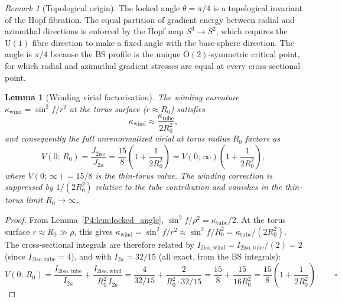 \documentclass[11pt,a4paper]{article}
\newtheorem{lemma}[theorem]{Lemma}
\theoremstyle{definition}
\theoremstyle{remark}
\newtheorem{remark}[theorem]{Remark}
\begin{document}
\begin{remark}[Topological origin]
\label{P4:rem:theta_topological_origin}
The locked angle $\theta = \pi/4$ is a topological invariant of the Hopf
fibration.  The equal partition of gradient energy between radial and
azimuthal directions is enforced by the Hopf map $S^3\to S^2$, which
requires the $\mathrm{U}(1)$ fibre direction to make a fixed angle with
the base-sphere direction.  The angle is $\pi/4$ because the BS profile
is the unique $\mathrm{O}(2)$-symmetric critical point, for which radial
and azimuthal gradient stresses are equal at every cross-sectional point.
\end{remark}

\begin{lemma}[Winding virial factorisation]
\label{P4:lem:virial_factor}
The winding curvature $\kappa_\mathrm{wind} = \sin^2\!f/r^2$ at the torus
surface ($r \approx R_0$) satisfies
\begin{equation}
  \kappa_\mathrm{wind} \approx \frac{\kappa_\mathrm{tube}}{2R_0^2},
  \label{P4:eq:kappa_wind_exact}
\end{equation}
and consequently the full unrenormalized virial at torus radius $R_0$ factors as
\begin{equation}
  V(0;\,R_0)
  = \frac{J_{2\mathrm{iso}}}{J_{2a}}
  = \frac{15}{8}\!\left(1 + \frac{1}{2R_0^2}\right)
  = V(0;\,\infty)\!\left(1 + \frac{1}{2R_0^2}\right),
  \label{P4:eq:virial_factor}
\end{equation}
where $V(0;\,\infty) = 15/8$ is the thin-torus value.
The winding correction is suppressed by $1/(2R_0^2)$ relative to the tube
contribution and vanishes in the thin-torus limit $R_0\to\infty$.
\end{lemma}

\begin{proof}
From Lemma~\ref{P4:lem:locked_angle}, $\sin^2\!f/\rho^2 = \kappa_\mathrm{tube}/2$.
At the torus surface $r \approx R_0 \gg \rho$, this gives
$\kappa_\mathrm{wind} = \sin^2\!f/r^2 \approx \sin^2\!f/R_0^2 = \kappa_\mathrm{tube}/(2R_0^2)$.
The cross-sectional integrals are therefore related by
$I_{2\mathrm{iso,wind}} = I_{2\mathrm{iso,tube}}/(2) = 2$ (since $I_{2\mathrm{iso,tube}} = 4$),
and with $I_{2a} = 32/15$ (all exact, from the BS integrals):
\[
  V(0;\,R_0)
  = \frac{I_{2\mathrm{iso,tube}}}{I_{2a}} + \frac{I_{2\mathrm{iso,wind}}}{R_0^2\,I_{2a}}
  = \frac{4}{32/15} + \frac{2}{R_0^2 \cdot 32/15}
  = \frac{15}{8} + \frac{15}{16R_0^2}
  = \frac{15}{8}\!\left(1+\frac{1}{2R_0^2}\right). \qquad\square
\]
\end{proof}
\end{document}
